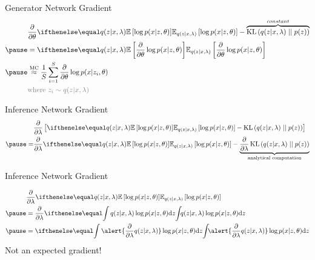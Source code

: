 \begin{frame}{Generator Network Gradient}
\vspace{-10pt}
\begin{equation*}
\begin{aligned}
&\pdv{\theta}\E[q(z|x,\lambda)]{\log p(x|z,\theta)} - \overbrace{\KL{q(z|x,\lambda)}{p(z)}}^{constant} \\ \pause 
&=\E[q(z|x,\lambda)]{\pdv{\theta}\log p(x|z,\theta)} \\ \pause
&\overset{\text{MC}}{\approx} \frac{1}{S}\sum_{i=1}^{S}
\pdv{\theta} \log p(x|z_{i},\theta) \\
&\textcolor{gray}{\text{where }z_i \sim q(z|x, \lambda)}
\end{aligned}
\end{equation*}
\pause
{}
\end{frame}

\begin{frame}{Inference Network Gradient}
\begin{equation*}
\begin{aligned}
&\pdv{\lambda}\left[\E[q(z|x,\lambda)]{\log p(x|z,\theta)} - \KL{q(z|x,\lambda)}{p(z)} \right] \\ \pause
=&\pdv{\lambda}\E[q(z|x,\lambda)]{\log p(x|z,\theta)} - \underbrace{\pdv{\lambda}\KL{q(z|x,\lambda)}{p(z)}}_{\text{analytical computation}} \\
\end{aligned}
\end{equation*}
\pause
{}
\end{frame}

\begin{frame}{Inference Network Gradient}


\begin{equation*}
\begin{aligned}
&\pdv{\lambda}\E[q(z|x,\lambda)]{\log p(x|z,\theta)} \\ \pause
&= \pdv{\lambda} \intl{q(z|x,\lambda)\log p(x|z,\theta)}{z} \\ \pause
&= \intl{\alert{\pdv{\lambda} q(z|x,\lambda)}\log p(x|z,\theta)}{z}
\end{aligned}
\end{equation*}
\pause
Not an expected gradient!
\end{frame}

